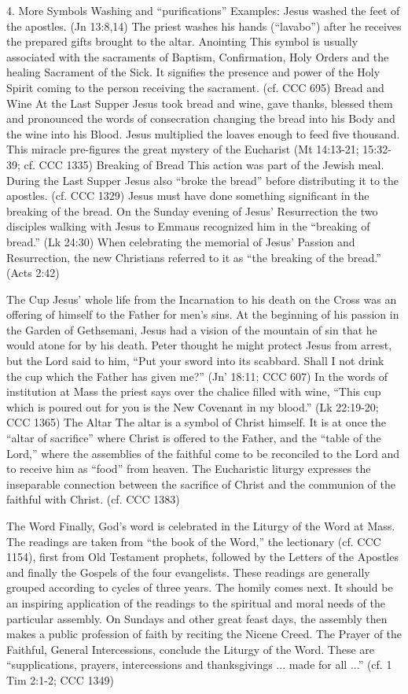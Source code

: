 \documentclass[oneside]{book}
\begin{document}
4. More Symbols
Washing and ``purifications''
Examples: Jesus washed the feet of the apostles. (Jn 13:8,14) The priest washes
his hands (``lavabo'') after he receives the prepared gifts brought to the
altar.
Anointing
This symbol is usually associated with the sacraments of Baptism, Confirmation,
Holy Orders and the healing Sacrament of the Sick. It signifies the presence and
power of the Holy Spirit coming to the person receiving the sacrament. (cf. CCC
695)
Bread and Wine
At the Last Supper Jesus took bread and wine, gave thanks, blessed them and
pronounced the words of consecration changing the bread into his Body and the
wine into his Blood. Jesus multiplied the loaves enough to feed five
thousand. This miracle pre-figures the great mystery of the Eucharist (Mt
14:13-21; 15:32-39; cf. CCC 1335)
Breaking of Bread
This action was part of the Jewish meal. During the Last Supper Jesus also
``broke the bread'' before distributing it to the apostles. (cf. CCC 1329) Jesus
must have done something significant in the breaking of the bread. On the Sunday
evening of Jesus' Resurrection the two disciples walking with Jesus to Emmaus
recognized him in the ``breaking of bread.'' (Lk 24:30) When celebrating the
memorial of Jesus' Passion and Resurrection, the new Christians referred to it
as ``the breaking of the bread.'' (Acts 2:42)

The Cup
Jesus' whole life from the Incarnation to his death on the Cross was an offering
of himself to the Father for men's sins. At the beginning of his passion in the
Garden of Gethsemani, Jesus had a vision of the mountain of sin that he would
atone for by his death. Peter thought he might protect Jesus from arrest, but
the Lord said to him, ``Put your sword into its scabbard. Shall I not drink the
cup which the Father has given me?'' (Jn' 18:11; CCC 607) In the words of
institution at Mass the priest says over the chalice filled with wine, ``This
cup which is poured out for you is the New Covenant in my blood.'' (Lk 22:19-20;
CCC 1365)
The Altar
The altar is a symbol of Christ himself. It is at once the ``altar of
sacrifice'' where Christ is offered to the Father, and the ``table of the
Lord,'' where the assemblies of the faithful come to be reconciled to the Lord
and to receive him as ``food'' from heaven. The Eucharistic liturgy expresses
the inseparable connection between the sacrifice of Christ and the communion of
the faithful with Christ. (cf. CCC 1383)

The Word
Finally, God's word is celebrated in the Liturgy of the Word at Mass. The
readings are taken from ``the book of the Word,'' the lectionary (cf. CCC 1154),
first from Old Testament prophets, followed by the Letters of the Apostles and
finally the Gospels of the four evangelists. These readings are generally
grouped according to cycles of three years. The homily comes next. It should be
an inspiring application of the readings to the spiritual and moral needs of the
particular assembly. On Sundays and other great feast days, the assembly then
makes a public profession of faith by reciting the Nicene Creed. The Prayer of
the Faithful, General Intercessions, conclude the Liturgy of the Word. These are
``supplications, prayers, intercessions and thanksgivings ... made for all ...''
(cf. 1 Tim 2:1-2; CCC 1349)
\end{document}
